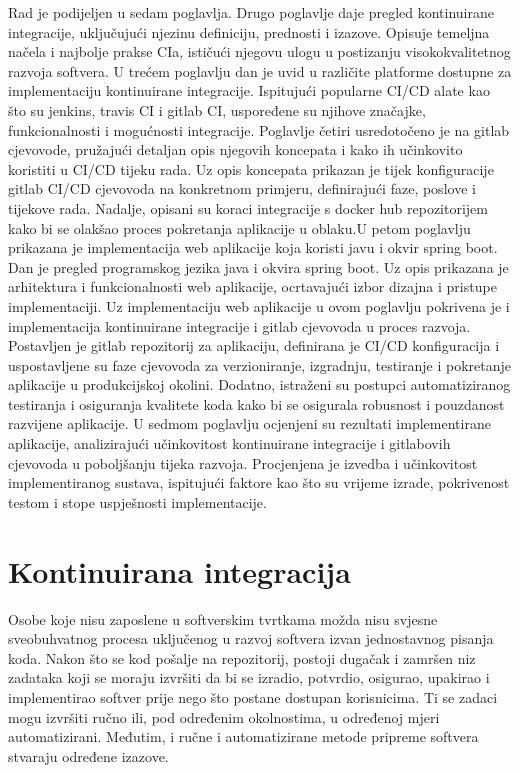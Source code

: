 \documentclass[a4paper,12pt,oneside]{article}
\begin{document}
Rad je podijeljen u sedam poglavlja. Drugo poglavlje daje pregled kontinuirane integracije, uključujući njezinu definiciju, prednosti i izazove. Opisuje temeljna načela i najbolje prakse CIa, ističući njegovu ulogu u postizanju visokokvalitetnog razvoja softvera. U trećem poglavlju dan je uvid u različite platforme dostupne za implementaciju kontinuirane integracije. Ispitujući popularne CI/CD alate kao što su jenkins, travis CI i gitlab CI, uspoređene su njihove značajke, funkcionalnosti i mogućnosti integracije. Poglavlje četiri usredotočeno je na gitlab cjevovode, pružajući detaljan opis njegovih koncepata i kako ih učinkovito koristiti u CI/CD tijeku rada. Uz opis koncepata prikazan je tijek konfiguracije gitlab CI/CD cjevovoda na konkretnom primjeru, definirajući faze, poslove i tijekove rada. Nadalje, opisani su koraci integracije s docker hub repozitorijem kako bi se olakšao proces pokretanja aplikacije u oblaku.U petom poglavlju prikazana je implementacija web aplikacije koja koristi javu i okvir spring boot. Dan je pregled programskog jezika java i okvira spring boot. Uz opis prikazana je arhitektura i funkcionalnosti web aplikacije, ocrtavajući izbor dizajna i pristupe implementaciji. Uz implementaciju web aplikacije u ovom poglavlju pokrivena je i implementacija kontinuirane integracije i gitlab cjevovoda u proces razvoja. Postavljen je gitlab repozitorij za aplikaciju, definirana je CI/CD konfiguracija i uspostavljene su faze cjevovoda za verzioniranje, izgradnju, testiranje i pokretanje aplikacije u produkcijskoj okolini. Dodatno, istraženi su postupci automatiziranog testiranja i osiguranja kvalitete koda kako bi se osigurala robusnost i pouzdanost razvijene aplikacije. U sedmom poglavlju ocjenjeni su rezultati implementirane aplikacije, analizirajući učinkovitost kontinuirane integracije i gitlabovih cjevovoda u poboljšanju tijeka razvoja. Procjenjena je  izvedba i učinkovitost implementiranog sustava, ispitujući faktore kao što su vrijeme izrade, pokrivenost testom i stope uspješnosti implementacije.


\newpage

\section{Kontinuirana integracija}
Osobe koje nisu zaposlene u softverskim tvrtkama možda nisu svjesne sveobuhvatnog procesa uključenog u razvoj softvera izvan jednostavnog pisanja koda. Nakon što se kod pošalje na repozitorij, postoji dugačak i zamršen niz zadataka koji se moraju izvršiti da bi se izradio, potvrdio, osigurao, upakirao i implementirao softver prije nego što postane dostupan korisnicima. Ti se zadaci mogu izvršiti ručno ili, pod određenim okolnostima, u određenoj mjeri automatizirani. Međutim, i ručne i automatizirane metode pripreme softvera stvaraju određene izazove.
\end{document}
